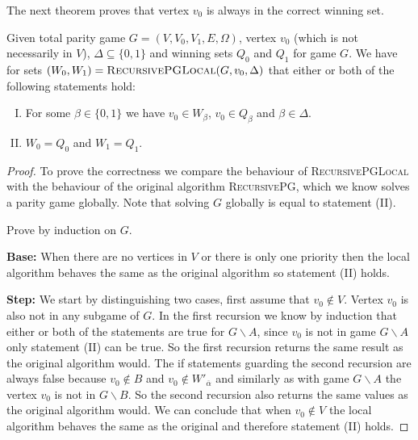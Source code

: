 The next theorem proves that vertex $v_0$ is always in the correct winning set.
\begin{theorem}
	Given total parity game $G = (V,V_0,V_1,E,\Omega)$, vertex $v_0$ (which is not necessarily in $V$), $\Delta \subseteq \{0,1\}$ and winning sets $Q_0$ and $Q_1$ for game $G$. We have for sets $(W_0,W_1) = \textsc{RecursivePGLocal}(G,v_0,\Delta)$ that either or both of the following statements hold:
	\begin{enumerate}[(I)]
		\item For some $\beta \in \{0,1\}$ we have $v_0 \in W_\beta$, $v_0 \in Q_\beta$ and $\beta \in \Delta$.
		\item $W_0 = Q_0$ and $W_1 = Q_1$.
	\end{enumerate}
\begin{proof}
	To prove the correctness we compare the behaviour of \textsc{RecursivePGLocal} with the behaviour of the original algorithm \textsc{RecursivePG}, which we know solves a parity game globally. Note that solving $G$ globally is equal to statement (II).
	
	Prove by induction on $G$.
	
	\textbf{Base: } When there are no vertices in $V$ or there is only one priority then the local algorithm behaves the same as the original algorithm so statement (II) holds.
	
	
	\textbf{Step: } We start by distinguishing two cases, first assume that $v_0 \notin V$. Vertex $v_0$ is also not in any subgame of $G$. In the first recursion we know by induction that either or both of the statements are true for $G\backslash A$, since $v_0$ is not in game $G\backslash A$ only statement (II) can be true. So the first recursion returns the same result as the original algorithm would. The if statements guarding the second recursion are always false because $v_0 \notin B$ and $v_0 \notin W'_{\overline{\alpha}}$ and similarly as with game $G\backslash A$ the vertex $v_0$ is not in $G\backslash B$. So the second recursion also returns the same values as the original algorithm would. We can conclude that when $v_0 \notin V$ the local algorithm behaves the same as the original and therefore statement (II) holds.
	

\end{proof}
\end{theorem}
